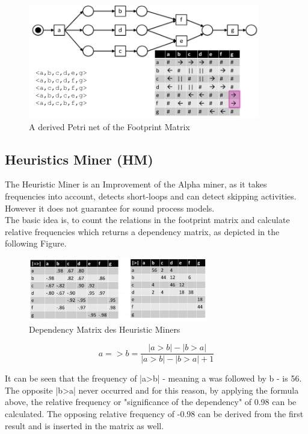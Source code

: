 \begin{figure}[H]
\includegraphics[width=0.9\textwidth]{Chapters/Notizen_Graphics/Notation_FootprintMatrix_PetriNet.jpg}
\caption{A derived Petri net of the Footprint Matrix\protect\cite{Buijs2017}} 
\end{figure}

\subsection{Heuristics Miner (HM)}
The Heuristic Miner is an Improvement of the Alpha miner, as it takes frequencies into account, detects short-loops and can detect skipping activities. However it does not guarantee for sound process models.\\

\noindent The basic idea is, to count the relations in the footprint matrix and calculate relative frequencies which returns a dependency matrix, as depicted in the following Figure.

\begin{figure}[H]
\begin{center}
\includegraphics[width=0.7\textwidth]{Chapters/Graphics_Paper/HeuristicMiner_DependencyMatrix.jpg}
\caption{Dependency Matrix des Heuristic Miners\protect\cite{Buijs2017}} 
\end{center}
\end{figure}
\[a => b = \frac{|a>b|-|b>a|}{|a>b|-|b>a|+1}\]
\vspace{5pt}


\noindent It can be seen that the frequency of |a>b| - meaning a was followed by b - is 56. The opposite |b>a| never occurred and for this reason, by applying the formula above, the relative frequency or "significance of the dependency" of 0.98 can be calculated. The opposing relative frequency of -0.98 can be derived from the first result and is inserted in the matrix as well.\protect\cite{Buijs2017}


